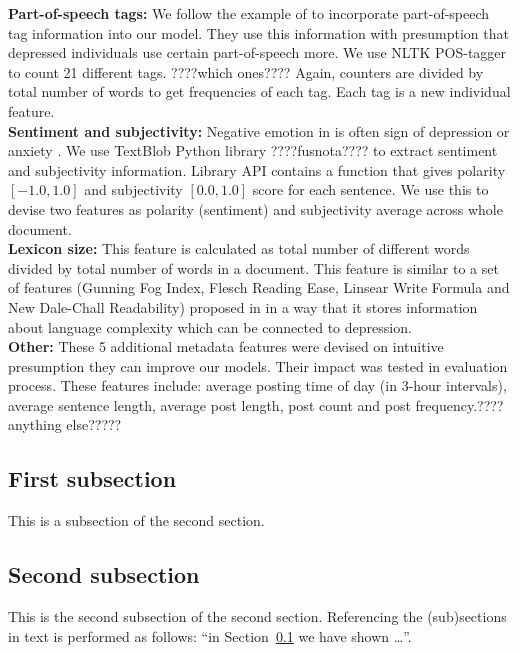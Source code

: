 \documentclass[10pt, a4paper]{article}
\begin{document}
\textbf{Part-of-speech tags:}
We follow the example of \cite{icpram18, LosadaCLEF2017} to incorporate part-of-speech tag information into our model. They use this information with presumption that depressed individuals use certain part-of-speech more. We use NLTK POS-tagger to count 21 different tags. ????which ones???? Again, counters are divided by total number of words to get frequencies of each tag. Each tag is a new individual feature.
\\

\textbf{Sentiment and subjectivity:}
Negative emotion in is often sign of depression or anxiety \citep{mosaiwi}. We use TextBlob Python library ????fusnota???? to extract sentiment and subjectivity information. Library API contains a function that gives polarity $[-1.0, 1.0]$ and subjectivity $[0.0, 1.0]$ score for each sentence. We use this to devise two features as polarity (sentiment) and subjectivity average across whole document. 
\\

\textbf{Lexicon size:}
This feature is calculated as total number of different words divided by total number of words in a document. This feature is similar to a set of features (Gunning Fog Index, Flesch Reading Ease, Linsear Write Formula and New Dale-Chall Readability) proposed in \cite{losada-crestani2016} in a way that it stores information about language complexity which can be connected to depression.
\\

\textbf{Other:}
These 5 additional metadata features were devised on intuitive presumption they can improve our models. Their impact was tested in evaluation process. These features include: average posting time of day (in 3-hour intervals), average sentence length, average post length, post count and post frequency.????anything else?????
\\

\subsection{First subsection}
\label{sec:first}

This is a subsection of the second section.

\subsection{Second subsection}

This is the second subsection of the second section. Referencing the (sub)sections in text is performed as follows: ``in Section~\ref{sec:first} we have shown \dots''.
\end{document}

